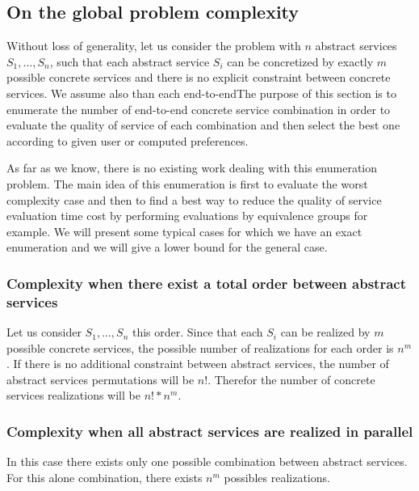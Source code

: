 \documentclass[10pt,journal,compsoc]{IEEEtran}
\begin{document}
\subsection{On the global problem complexity}
Without loss of generality, let us consider the problem with $n$ abstract services $S_1,\dots, S_n$, such that each abstract service $S_i$ can be concretized by exactly $m$ possible concrete services and there is no explicit constraint between concrete services. We assume also than each end-to-endThe purpose of this section is to enumerate the number of end-to-end concrete service combination in order to evaluate the quality of service of each combination and then select the best one according to given user or computed preferences.

As far as we know, there is no existing work dealing with this enumeration problem. The main idea of this enumeration is first to evaluate the worst complexity case and then to find a best way to reduce the quality of service evaluation time cost by performing evaluations by equivalence groups for example.  We will present some typical  cases for which we have an exact enumeration and we will give a lower bound for the general case.

\subsubsection{Complexity when there exist a total order between abstract services}
Let us consider $S_1,\dots, S_n$ this order.  Since that each $S_i$ can be realized by $m$ possible concrete services, the possible number of realizations for each order is $n^m$. If there is no additional constraint between abstract services, the number of abstract services permutations will be $n!$. Therefor the  number of  concrete services realizations will be $n!*n^m$.

\subsubsection{Complexity when all abstract services are realized in parallel}
In this case there exists only one possible combination between abstract services. For this alone combination, there exists  $n^m$ possibles realizations. 
\end{document}
